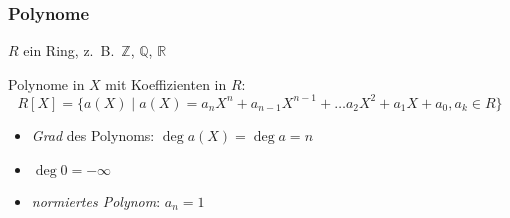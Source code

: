 %
%
%
\begin{frame}[t]
\frametitle{Polynome}
$R$ ein Ring, z.~B.~$\mathbb{Z}$, $\mathbb{Q}$, $\mathbb{R}$

\begin{definition}
Polynome in $X$ mit Koeffizienten in $R$:
\[
R[X]
=
\{
a(X)\;|\;
a(X) = a_nX^n+a_{n-1}X^{n-1} + \dots a_2X^2+a_1X + a_0, a_k\in R
\}
\]
\end{definition}

\begin{itemize}
\item<2-> {\em Grad} des Polynoms: $\deg a(X) = \deg a = n$
\item<3-> $\deg 0 = -\infty$
\item<4-> {\em normiertes Polynom}: $a_n=1$
\end{itemize}


\end{frame}
